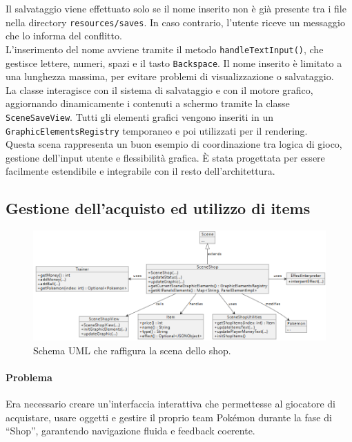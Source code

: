 \documentclass[a4paper,12pt]{report}
\begin{document}
{{Il salvataggio viene effettuato solo se il nome inserito non è già presente tra i file nella directory \texttt{resources/saves}. In caso contrario, l’utente riceve un messaggio che lo informa del conflitto.\\
L’inserimento del nome avviene tramite il metodo \texttt{handleTextInput()}, che gestisce lettere, numeri, spazi e il tasto \texttt{Backspace}. Il nome inserito è limitato a una lunghezza massima, per evitare problemi di visualizzazione o salvataggio.\\
La classe interagisce con il sistema di salvataggio e con il motore grafico, aggiornando dinamicamente i contenuti a schermo tramite la classe \texttt{SceneSaveView}. Tutti gli elementi grafici vengono inseriti in un \linebreak \texttt{GraphicElementsRegistry} temporaneo e poi utilizzati per il rendering.\\
Questa scena rappresenta un buon esempio di coordinazione tra logica di gioco, gestione dell’input utente e flessibilità grafica. È stata progettata per essere facilmente estendibile e integrabile con il resto dell’architettura.

\subsection*{Gestione dell'acquisto ed utilizzo di items}

\begin{figure}[H]
\centering{}
\includegraphics[width=\textwidth]{immagini/sceneShopUml.png}
\caption{Schema UML che raffigura la scena dello shop. }
\label{immagini/MenuLoadBoxuml.png}
\end{figure}

\paragraph{Problema}
Era necessario creare un’interfaccia interattiva che permettesse al giocatore di acquistare, usare oggetti e gestire il proprio team Pokémon durante la fase di “Shop”, garantendo navigazione fluida e feedback coerente.

}}
\end{document}
